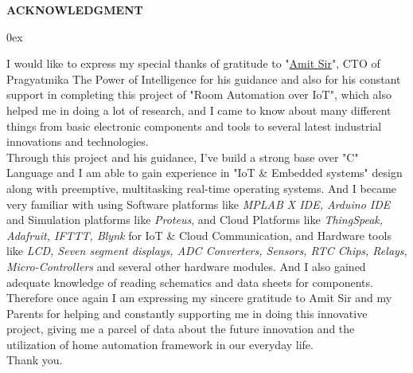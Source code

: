 \documentclass[11pt,a4paper]{article}
\begin{document}


\begin{center}

\Large{\bfseries{ACKNOWLEDGMENT}}\\
\vspace*{2cm}

\end{center}
\parindent 0ex %

I would like to express my special thanks of gratitude to "\uline{Amit Sir}", CTO of Pragyatmika The Power of Intelligence for his guidance and also for his constant support in completing this project of "Room Automation over IoT", which also helped me in doing a lot of research, and I came to know about many different things from basic electronic components and tools to several latest industrial innovations and technologies.\\ 

Through this project and his guidance, I've build a strong base over "C" Language and I am able to gain experience in "IoT \& Embedded systems" design along with preemptive, multitasking real-time operating systems. And I became very familiar with using Software platforms like \textit{MPLAB X IDE, Arduino IDE} and Simulation platforms like \textit{Proteus}, and Cloud Platforms like \textit{ThingSpeak, Adafruit, IFTTT, Blynk} for IoT \& Cloud Communication, and Hardware tools like \textit{LCD, Seven segment displays, ADC Converters, Sensors, RTC Chips, Relays, Micro-Controllers} and several other hardware modules. And I also gained adequate knowledge of reading schematics and data sheets for components.\\

Therefore once again I am expressing my sincere gratitude to Amit Sir and my Parents for helping and constantly supporting me in doing this innovative project, giving me a parcel of data about the future innovation and the utilization of home automation framework in our everyday life.\\

\vfill
Thank you.
\vfill\vfill\vfill

\thispagestyle{empty} %
\clearpage %
\newpage
\end{document}
